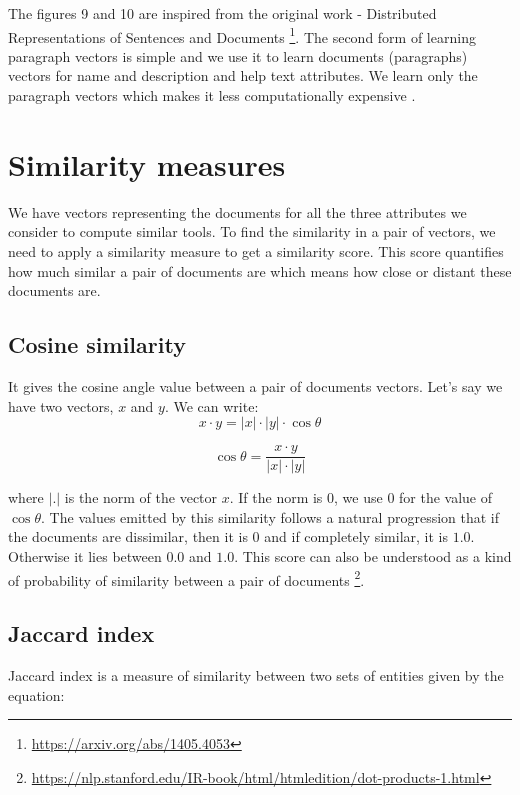 The figures 9 and 10 are inspired from the original work - Distributed Representations of Sentences and Documents \footnote{\label{pv}\url{https://arxiv.org/abs/1405.4053}}.
The second form of learning paragraph vectors is simple and we use it to learn documents (paragraphs) vectors for name and description and help text attributes. We learn only the paragraph vectors which makes it less computationally expensive \cite{DBLP:journals/corr/LeM14}.


\section{Similarity measures}
We have vectors representing the documents for all the three attributes we consider to compute similar tools. To find the similarity in a pair of vectors, we need to apply a similarity measure to get a similarity score. This score quantifies how much similar a pair of documents are which means how close or distant these documents are.


\subsection{Cosine similarity}
It gives the cosine angle value between a pair of documents vectors. Let's say we have two vectors, $x$ and $y$. We can write:
\begin{equation}
x \cdot y = |x| \cdot |y| \cdot \cos{\theta}
\end{equation}

\begin{equation}
\cos{\theta} = \frac {x \cdot y}{|x| \cdot |y|} 
\end{equation}

where $|.|$ is the norm of the vector $x$. If the norm is $0$, we use $0$ for the value of $\cos{\theta}$. The values emitted by this similarity follows a natural progression that if the documents are dissimilar, then it is $0$ and if completely similar, it is $1.0$. Otherwise it lies between $0.0$ and $1.0$. This score can also be understood as a kind of probability of similarity between a pair of documents \footnote{\url{https://nlp.stanford.edu/IR-book/html/htmledition/dot-products-1.html}}. 


\subsection{Jaccard index}
Jaccard index is a measure of similarity between two sets of entities given by the equation:

